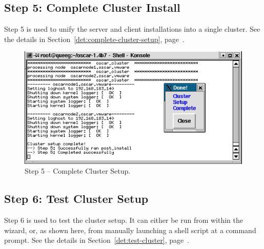 \clearpage
\subsection{Step 5: Complete Cluster Install} 

Step 5 is used to unify the server and client installations into a
single cluster.  See the details in
Section~\ref{det:complete-cluster-setup},
page~\pageref{det:complete-cluster-setup}.

\begin{figure}[h!]
   \begin{center}
     \centerline{\includegraphics[scale=\imgscale]{figs/7_sbs-complete-cluster-setup}}
     \caption{Step 5 -- Complete Cluster Setup.}
     \label{fig:sbs-install-wizard-s5}
   \end{center}
 \end{figure}



\subsection{Step 6: Test Cluster Setup}

Step 6 is used to test the cluster setup.  It can either be run from
within the wizard, or, as shown here, from manually launching a shell
script at a  command prompt.  See the details in
Section~\ref{det:test-cluster}, page~\pageref{det:test-cluster}.

